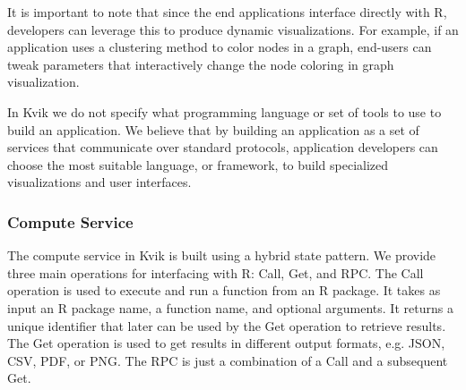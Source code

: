 It is important to note that since the end applications interface directly with
R, developers can leverage this to produce dynamic visualizations. For example,
if an application uses a clustering method to color nodes in a graph, end-users
can tweak parameters that interactively change the node coloring in graph
visualization.


In Kvik we do not specify what programming language or set of tools to use to
build an application. We believe that by building an application as a set of
services that communicate over standard protocols, application developers can
choose the most suitable language, or framework, to build specialized
visualizations and user interfaces. 

\subsubsection*{Compute Service}
The compute service in Kvik is built using a hybrid state pattern\cite{opencpu}.
We provide three main operations for interfacing with R:
Call, Get, and RPC. The Call operation is used to execute and run a function
from an R package. 
It takes as input an R package name, a function name, and
optional arguments. It returns a unique identifier that later can be used by the
Get operation to retrieve results. The Get operation is used to get results in
different output formats, e.g. JSON, CSV, PDF, or PNG. The RPC is just a
combination of a Call and a subsequent Get. 




